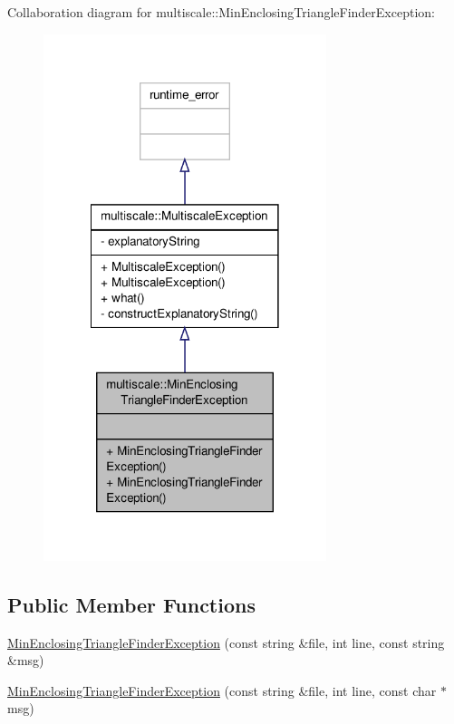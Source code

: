 Collaboration diagram for multiscale\-:\-:Min\-Enclosing\-Triangle\-Finder\-Exception\-:\nopagebreak
\begin{figure}[H]
\begin{center}
\leavevmode
\includegraphics[width=234pt]{classmultiscale_1_1MinEnclosingTriangleFinderException__coll__graph}
\end{center}
\end{figure}
\subsection*{Public Member Functions}
\begin{DoxyCompactItemize}
\item 
\hyperlink{classmultiscale_1_1MinEnclosingTriangleFinderException_a5e557314d6e619be66b5c348890e27ff}{Min\-Enclosing\-Triangle\-Finder\-Exception} (const string \&file, int line, const string \&msg)
\item 
\hyperlink{classmultiscale_1_1MinEnclosingTriangleFinderException_a7ff2a8391032f1204050c784f2a61849}{Min\-Enclosing\-Triangle\-Finder\-Exception} (const string \&file, int line, const char $\ast$msg)
\end{DoxyCompactItemize}



